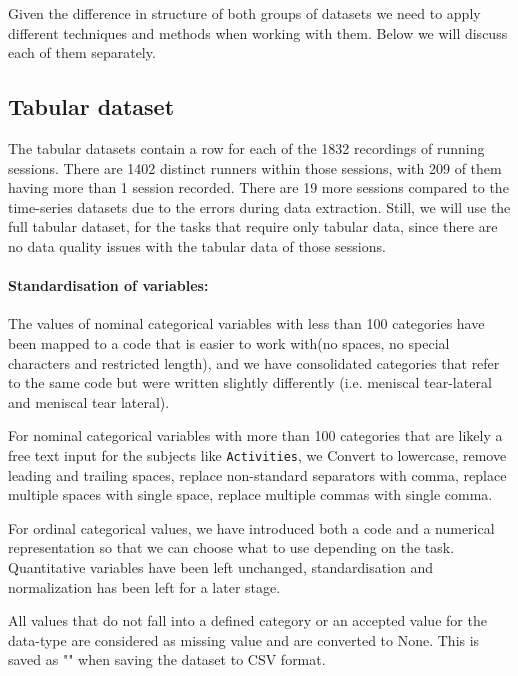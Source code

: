 Given the difference in structure of both groups of datasets we need to apply different techniques and methods when working with them. Below we will discuss each of them separately.

\subsection{Tabular dataset}\label{subsec:method-tabular-dataset}
The tabular datasets contain a row for each of the 1832 recordings of running sessions. There are 1402 distinct runners within those sessions, with 209 of them having more than 1 session recorded. There are 19 more sessions compared to the time-series datasets due to the errors during data extraction. Still, we will use the full tabular dataset, for the tasks that require only tabular data, since there are no data quality issues with the tabular data of those sessions.

\paragraph{Standardisation of variables:}
The values of nominal categorical variables with less than 100 categories have been mapped to a code that is easier to work with(no spaces, no special characters and restricted length), and we have consolidated categories that refer to the same code but were written slightly differently (i.e. meniscal tear-lateral and meniscal tear lateral).

For nominal categorical variables with more than 100 categories that are likely a free text input for the subjects like \texttt{Activities}, we Convert to lowercase, remove leading and trailing spaces, replace non-standard separators with comma, replace multiple spaces with single space, replace multiple commas with single comma.

For ordinal categorical values, we have introduced both a code and a numerical representation so that we can choose what to use depending on the task.
Quantitative variables have been left unchanged, standardisation and normalization has been left for a later stage.

All values that do not fall into a defined category or an accepted value for the data-type are considered as missing value and are converted to None. This is saved as "" when saving the dataset to CSV format.

